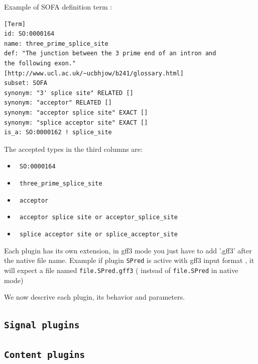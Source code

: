 \documentclass[a4paper,titlepage]{report}
\begin{document}
Example of SOFA definition term :
\begin{Verbatim}
[Term]
id: SO:0000164
name: three_prime_splice_site
def: "The junction between the 3 prime end of an intron and 
the following exon." [http://www.ucl.ac.uk/~ucbhjow/b241/glossary.html]
subset: SOFA
synonym: "3' splice site" RELATED []
synonym: "acceptor" RELATED []
synonym: "acceptor splice site" EXACT []
synonym: "splice acceptor site" EXACT []
is_a: SO:0000162 ! splice_site
\end{Verbatim}

The accepted types in the third columns are:

\begin{itemize}
\item\texttt{ SO:0000164}
\item\texttt{ three\_prime\_splice\_site}
\item\texttt{ acceptor }
\item\texttt{ acceptor splice site or  acceptor\_splice\_site}
\item\texttt{ splice acceptor site or  splice\_acceptor\_site}
\end{itemize}

Each plugin has its own extension, in gff3 mode you just have to add '.gff3' after the native file name.
Example if plugin \texttt{SPred} is active with gff3 input format , it will expect 
a file named \texttt{file.SPred.gff3} ( instead of \texttt{file.SPred} in native mode)

We now descrive each plugin, its behavior and parameters.

\subsection{\texttt{Signal plugins}}













\subsection{\texttt{Content plugins}}








\end{document}
